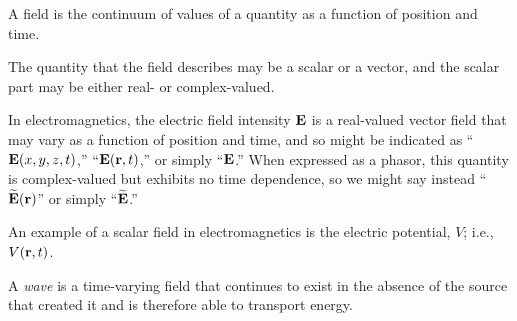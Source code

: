 

\label{m0001_What_is_a_Field} %

\begin{mdframed}[backgroundcolor=yellow!20,nobreak=true] 
A field 
is the continuum of values of a quantity as a function of position and time. 
\end{mdframed}

The quantity that the field describes may be a scalar or a vector, 
and the scalar part may be either real- or complex-valued.

In electromagnetics, the electric field intensity ${\bf E}$ is a real-valued vector field that may vary as a function of position and time, and so might be indicated as 
``${\bf E}(x,y,z,t)$,'' ``${\bf E}({\bf r},t)$,'' or simply ``${\bf E}$.''  When expressed as a phasor, this quantity is complex-valued but exhibits no time dependence, so we might say instead ``$\widetilde{{\bf E}}({\bf r})$'' or simply ``$\widetilde{{\bf E}}$.''  

An example of a scalar field 
in electromagnetics is the electric potential, $V$; i.e., $V({\bf r},t)$.

A \emph{wave} 
is a time-varying field that continues to exist in the absence of the source that created it and is therefore able to transport energy.

